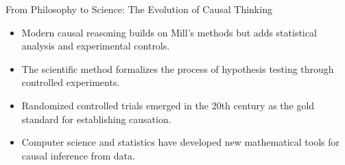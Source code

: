 \documentclass{beamer}
\begin{document}
\begin{frame}{From Philosophy to Science: The Evolution of Causal Thinking}
    \begin{itemize}
        \item Modern causal reasoning builds on Mill's methods but adds statistical analysis and experimental controls.
        \item The scientific method formalizes the process of hypothesis testing through controlled experiments.
        \item Randomized controlled trials emerged in the 20th century as the gold standard for establishing causation.
        \item Computer science and statistics have developed new mathematical tools for causal inference from data.
    \end{itemize}
    
    \begin{center}
    \end{center}
\end{frame}
\end{document}
